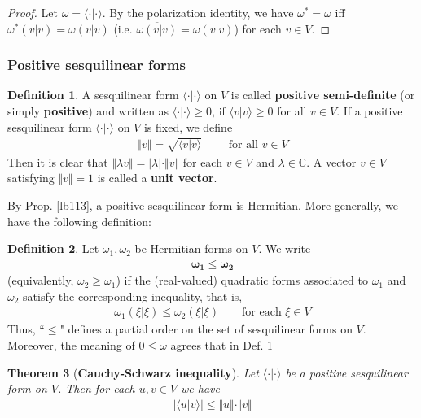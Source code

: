 \documentclass[12pt,b5paper,notitlepage]{article}
\theoremstyle{definition}
\newtheorem{df}{Definition}[section]
\theoremstyle{plain}
\newtheorem{thm}[df]{Theorem}
\newcommand{\ovl}{\overline}
\newcommand{\bk}[1]{\langle {#1}\rangle}
\newcommand{\Cbb}{\mathbb C}
\numberwithin{equation}{section}
\begin{document}
\begin{proof}
Let $\omega=\bk{\cdot|\cdot}$. By the polarization identity, we have $\omega^*=\omega$ iff $\omega^*(v|v)=\omega(v|v)$ (i.e. $\ovl{\omega(v|v)}=\omega(v|v)$) for each $v\in V$. 
\end{proof}


\subsubsection{Positive sesquilinear forms}


\begin{df}\label{lb139}
A sesquilinear form $\bk{\cdot|\cdot}$ on $V$ is called \textbf{positive semi-definite} (or simply \textbf{positive}) and written as $\bk{\cdot|\cdot}\geq0$,  if $\bk{v|v}\geq0$ for all $v\in V$. If a positive sesquilinear form $\bk{\cdot|\cdot}$ on $V$ is fixed, we define
\begin{align}
\Vert v\Vert=\sqrt{\bk{v|v}}\qquad\text{ for all }v\in V
\end{align} 
Then it is clear that $\Vert\lambda v\Vert=|\lambda|\cdot\Vert v\Vert$ for each $v\in V$ and $\lambda\in\Cbb$. A vector $v\in V$ satisfying $\Vert v\Vert=1$ is called a \textbf{unit vector}.  
\end{df}

By Prop. \ref{lb113}, a positive sesquilinear form is Hermitian. More generally, we have the following definition:

\begin{df}\label{lb140}
Let $\omega_1,\omega_2$ be Hermitian forms on $V$. We write
\begin{align*}
\pmb{\omega_1\leq\omega_2}
\end{align*}
(equivalently, $\omega_2\geq\omega_1$) if the (real-valued) quadratic forms associated to $\omega_1$ and $\omega_2$ satisfy the corresponding inequality, that is,
\begin{align*}
\omega_1(\xi|\xi)\leq\omega_2(\xi|\xi)\qquad\text{for each }\xi\in V
\end{align*}
Thus, ``$\leq$" defines a partial order on the set of sesquilinear forms on $V$. Moreover, the meaning of $0\leq\omega$ agrees that in Def. \ref{lb139}
\end{df}




\begin{thm}[\textbf{Cauchy-Schwarz inequality}] \label{lb165}
Let $\bk{\cdot|\cdot}$ be a positive sesquilinear form on $V$. Then for each $u,v\in V$ we have
\begin{align*}
|\bk{u|v}|\leq\Vert u\Vert\cdot\Vert v\Vert
\end{align*}
\end{thm}
\end{document}
